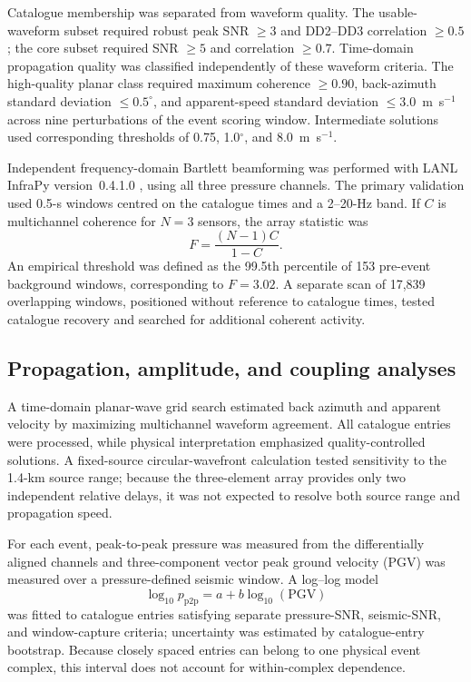 \documentclass[]{seismica}
\begin{document}
Catalogue membership was separated from waveform quality. The
usable-waveform subset required robust peak SNR $\geq3$ and DD2--DD3
correlation $\geq0.5$; the core subset required SNR $\geq5$ and correlation
$\geq0.7$. Time-domain propagation quality was classified independently of
these waveform criteria. The high-quality planar class required maximum
coherence $\geq0.90$, back-azimuth standard deviation
$\leq0.5^\circ$, and apparent-speed standard deviation
$\leq3.0$~m~s$^{-1}$ across nine perturbations of the event scoring window.
Intermediate solutions used corresponding thresholds of 0.75,
1.0$^\circ$, and 8.0~m~s$^{-1}$.

Independent frequency-domain Bartlett beamforming was performed with LANL
InfraPy version~0.4.1.0 \citep{webster_infrapy_2025}, using all three pressure
channels. The primary validation used 0.5-s windows centred on the catalogue
times and a 2--20-Hz band. If $C$ is multichannel coherence for $N=3$
sensors, the array statistic was
\begin{equation}
 F=\frac{(N-1)C}{1-C}.
\end{equation}
An empirical threshold was defined as the 99.5th percentile of 153 pre-event
background windows, corresponding to $F=3.02$. A separate scan of 17,839
overlapping windows, positioned without reference to catalogue times, tested
catalogue recovery and searched for additional coherent activity.

\subsection{Propagation, amplitude, and coupling analyses}

A time-domain planar-wave grid search estimated back azimuth and apparent
velocity by maximizing multichannel waveform agreement. All catalogue entries
were processed, while physical interpretation emphasized quality-controlled
solutions. A fixed-source circular-wavefront calculation tested sensitivity to
the 1.4-km source range; because the three-element array provides only two
independent relative delays, it was not expected to resolve both source range
and propagation speed.

For each event, peak-to-peak pressure was measured from the differentially
aligned channels and three-component vector peak ground velocity (PGV) was
measured over a pressure-defined seismic window. A log--log model
\begin{equation}
 \log_{10}p_{\mathrm{p2p}}=a+b\log_{10}(\mathrm{PGV})
 \label{eq:power_law}
\end{equation}
was fitted to catalogue entries satisfying separate pressure-SNR, seismic-SNR,
and window-capture criteria; uncertainty was estimated by catalogue-entry
bootstrap. Because closely spaced entries can belong to one physical event
complex, this interval does not account for within-complex dependence.
\end{document}
